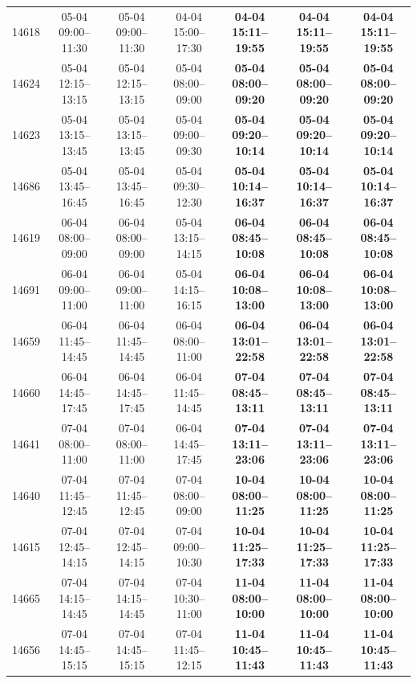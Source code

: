 \begin{table}[htbp]
\begin{tabular}{|r|c|c|c|c|c|c|}
14618 & 05-04 09:00--11:30 & 05-04 09:00--11:30 & 04-04 15:00--17:30 & \textbf{04-04 15:11--19:55} & \textbf{04-04 15:11--19:55} & \textbf{04-04 15:11--19:55} \\ 
14624 & 05-04 12:15--13:15 & 05-04 12:15--13:15 & 05-04 08:00--09:00 & \textbf{05-04 08:00--09:20} & \textbf{05-04 08:00--09:20} & \textbf{05-04 08:00--09:20} \\ 
14623 & 05-04 13:15--13:45 & 05-04 13:15--13:45 & 05-04 09:00--09:30 & \textbf{05-04 09:20--10:14} & \textbf{05-04 09:20--10:14} & \textbf{05-04 09:20--10:14} \\ 
14686 & 05-04 13:45--16:45 & 05-04 13:45--16:45 & 05-04 09:30--12:30 & \textbf{05-04 10:14--16:37} & \textbf{05-04 10:14--16:37} & \textbf{05-04 10:14--16:37} \\ 
14619 & 06-04 08:00--09:00 & 06-04 08:00--09:00 & 05-04 13:15--14:15 & \textbf{06-04 08:45--10:08} & \textbf{06-04 08:45--10:08} & \textbf{06-04 08:45--10:08} \\ 
14691 & 06-04 09:00--11:00 & 06-04 09:00--11:00 & 05-04 14:15--16:15 & \textbf{06-04 10:08--13:00} & \textbf{06-04 10:08--13:00} & \textbf{06-04 10:08--13:00} \\ 
14659 & 06-04 11:45--14:45 & 06-04 11:45--14:45 & 06-04 08:00--11:00 & \textbf{06-04 13:01--22:58} & \textbf{06-04 13:01--22:58} & \textbf{06-04 13:01--22:58} \\ 
14660 & 06-04 14:45--17:45 & 06-04 14:45--17:45 & 06-04 11:45--14:45 & \textbf{07-04 08:45--13:11} & \textbf{07-04 08:45--13:11} & \textbf{07-04 08:45--13:11} \\ 
14641 & 07-04 08:00--11:00 & 07-04 08:00--11:00 & 06-04 14:45--17:45 & \textbf{07-04 13:11--23:06} & \textbf{07-04 13:11--23:06} & \textbf{07-04 13:11--23:06} \\ 
14640 & 07-04 11:45--12:45 & 07-04 11:45--12:45 & 07-04 08:00--09:00 & \textbf{10-04 08:00--11:25} & \textbf{10-04 08:00--11:25} & \textbf{10-04 08:00--11:25} \\ 
14615 & 07-04 12:45--14:15 & 07-04 12:45--14:15 & 07-04 09:00--10:30 & \textbf{10-04 11:25--17:33} & \textbf{10-04 11:25--17:33} & \textbf{10-04 11:25--17:33} \\ 
14665 & 07-04 14:15--14:45 & 07-04 14:15--14:45 & 07-04 10:30--11:00 & \textbf{11-04 08:00--10:00} & \textbf{11-04 08:00--10:00} & \textbf{11-04 08:00--10:00} \\ 
14656 & 07-04 14:45--15:15 & 07-04 14:45--15:15 & 07-04 11:45--12:15 & \textbf{11-04 10:45--11:43} & \textbf{11-04 10:45--11:43} & \textbf{11-04 10:45--11:43} \\ 

\end{tabular}
\end{table}
